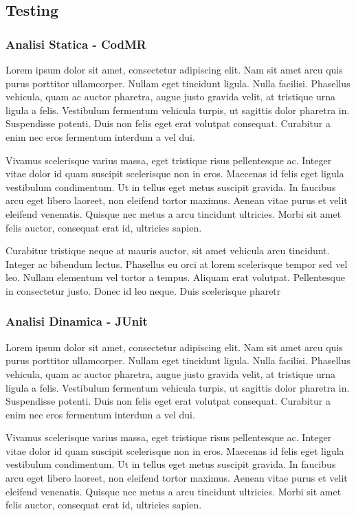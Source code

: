 \subsection{Testing}
\subsubsection{Analisi Statica - CodMR}

Lorem ipsum dolor sit amet, consectetur adipiscing elit. Nam sit amet arcu quis purus porttitor ullamcorper. Nullam eget tincidunt ligula. Nulla facilisi. Phasellus vehicula, quam ac auctor pharetra, augue justo gravida velit, at tristique urna ligula a felis. Vestibulum fermentum vehicula turpis, ut sagittis dolor pharetra in. Suspendisse potenti. Duis non felis eget erat volutpat consequat. Curabitur a enim nec eros fermentum interdum a vel dui. 

Vivamus scelerisque varius massa, eget tristique risus pellentesque ac. Integer vitae dolor id quam suscipit scelerisque non in eros. Maecenas id felis eget ligula vestibulum condimentum. Ut in tellus eget metus suscipit gravida. In faucibus arcu eget libero laoreet, non eleifend tortor maximus. Aenean vitae purus et velit eleifend venenatis. Quisque nec metus a arcu tincidunt ultricies. Morbi sit amet felis auctor, consequat erat id, ultricies sapien. 

Curabitur tristique neque at mauris auctor, sit amet vehicula arcu tincidunt. Integer ac bibendum lectus. Phasellus eu orci at lorem scelerisque tempor sed vel leo. Nullam elementum vel tortor a tempus. Aliquam erat volutpat. Pellentesque in consectetur justo. Donec id leo neque. Duis scelerisque pharetr


\subsubsection{Analisi Dinamica - JUnit}
Lorem ipsum dolor sit amet, consectetur adipiscing elit. Nam sit amet arcu quis purus porttitor ullamcorper. Nullam eget tincidunt ligula. Nulla facilisi. Phasellus vehicula, quam ac auctor pharetra, augue justo gravida velit, at tristique urna ligula a felis. Vestibulum fermentum vehicula turpis, ut sagittis dolor pharetra in. Suspendisse potenti. Duis non felis eget erat volutpat consequat. Curabitur a enim nec eros fermentum interdum a vel dui. 

Vivamus scelerisque varius massa, eget tristique risus pellentesque ac. Integer vitae dolor id quam suscipit scelerisque non in eros. Maecenas id felis eget ligula vestibulum condimentum. Ut in tellus eget metus suscipit gravida. In faucibus arcu eget libero laoreet, non eleifend tortor maximus. Aenean vitae purus et velit eleifend venenatis. Quisque nec metus a arcu tincidunt ultricies. Morbi sit amet felis auctor, consequat erat id, ultricies sapien. 

